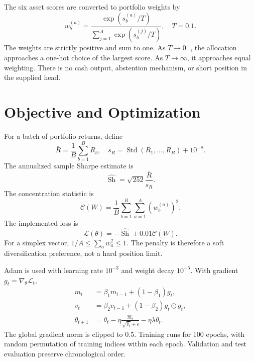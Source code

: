 \documentclass[10pt,a4paper,twocolumn]{article}
\begin{document}
The six asset scores are converted to portfolio weights by
\begin{equation}
w_b^{(a)}=\frac{\exp(s_b^{(a)}/T)}{\sum_{j=1}^{A}\exp(s_b^{(j)}/T)},\quad T=0.1.
\end{equation}
The weights are strictly positive and sum to one. As $T\to0^+$, the allocation approaches a one-hot choice of the largest score. As $T\to\infty$, it approaches equal weighting. There is no cash output, abstention mechanism, or short position in the supplied head.

\section{Objective and Optimization}
For a batch of portfolio returns, define
\begin{equation}
\bar R=\frac{1}{B}\sum_{b=1}^{B}R_b,\quad s_R=\operatorname{Std}(R_1,\ldots,R_B)+10^{-8}.
\end{equation}
The annualized sample Sharpe estimate is
\begin{equation}
\widehat{\operatorname{Sh}}=\sqrt{252}\frac{\bar R}{s_R}.
\end{equation}
The concentration statistic is
\begin{equation}
\mathcal{C}(W)=\frac{1}{B}\sum_{b=1}^{B}\sum_{a=1}^{A}(w_b^{(a)})^2.
\end{equation}
The implemented loss is
\begin{equation}
\mathcal{L}(\theta)=-\widehat{\operatorname{Sh}}+0.01\mathcal{C}(W).
\end{equation}
For a simplex vector, $1/A\leq\sum_a w_a^2\leq1$. The penalty is therefore a soft diversification preference, not a hard position limit.

Adam is used with learning rate $10^{-3}$ and weight decay $10^{-5}$. With gradient $g_t=\nabla_\theta\mathcal{L}_t$,
\begin{align}
m_t&=\beta_1m_{t-1}+(1-\beta_1)g_t,\\
v_t&=\beta_2v_{t-1}+(1-\beta_2)g_t\odot g_t,\\
\theta_{t+1}&=\theta_t-\eta\frac{\widehat m_t}{\sqrt{\widehat v_t}+\epsilon}-\eta\lambda\theta_t.
\end{align}
The global gradient norm is clipped to $0.5$. Training runs for 100 epochs, with random permutation of training indices within each epoch. Validation and test evaluation preserve chronological order.
\end{document}
